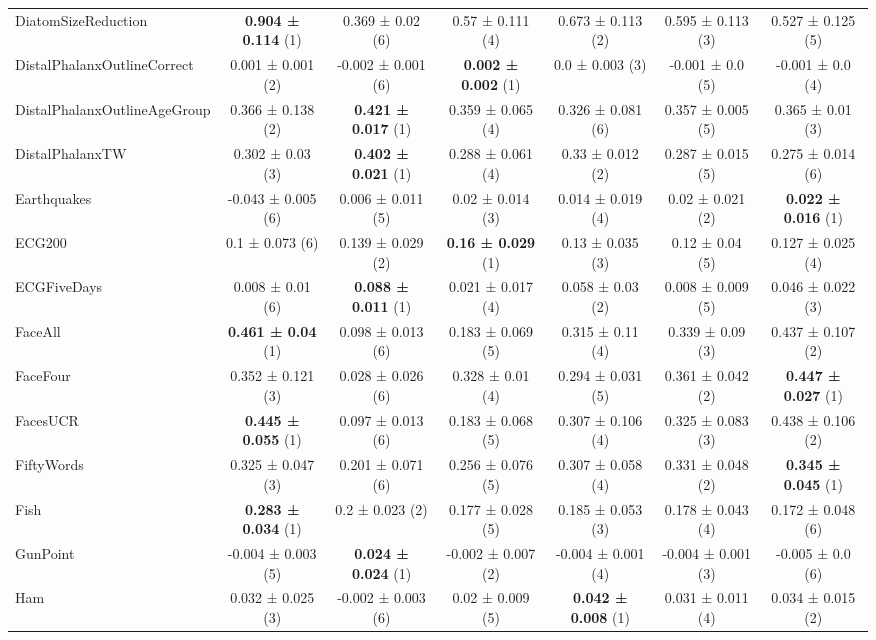 \begin{table}[ht]
\begin{adjustbox}{width=\textwidth}
\begin{tabular}{lcccccc}
    DiatomSizeReduction & \textbf{0.904 ± 0.114} (1) & 0.369 ± 0.02 (6) & 0.57 ± 0.111 (4) & 0.673 ± 0.113 (2) & 0.595 ± 0.113 (3) & 0.527 ± 0.125 (5) \\
    DistalPhalanxOutlineCorrect & 0.001 ± 0.001 (2) & -0.002 ± 0.001 (6) & \textbf{0.002 ± 0.002} (1) & 0.0 ± 0.003 (3) & -0.001 ± 0.0 (5) & -0.001 ± 0.0 (4) \\
    DistalPhalanxOutlineAgeGroup & 0.366 ± 0.138 (2) & \textbf{0.421 ± 0.017} (1) & 0.359 ± 0.065 (4) & 0.326 ± 0.081 (6) & 0.357 ± 0.005 (5) & 0.365 ± 0.01 (3) \\
    DistalPhalanxTW & 0.302 ± 0.03 (3) & \textbf{0.402 ± 0.021} (1) & 0.288 ± 0.061 (4) & 0.33 ± 0.012 (2) & 0.287 ± 0.015 (5) & 0.275 ± 0.014 (6) \\
    Earthquakes & -0.043 ± 0.005 (6) & 0.006 ± 0.011 (5) & 0.02 ± 0.014 (3) & 0.014 ± 0.019 (4) & 0.02 ± 0.021 (2) & \textbf{0.022 ± 0.016} (1) \\
    ECG200 & 0.1 ± 0.073 (6) & 0.139 ± 0.029 (2) & \textbf{0.16 ± 0.029} (1) & 0.13 ± 0.035 (3) & 0.12 ± 0.04 (5) & 0.127 ± 0.025 (4) \\
    ECGFiveDays & 0.008 ± 0.01 (6) & \textbf{0.088 ± 0.011} (1) & 0.021 ± 0.017 (4) & 0.058 ± 0.03 (2) & 0.008 ± 0.009 (5) & 0.046 ± 0.022 (3) \\
    FaceAll & \textbf{0.461 ± 0.04} (1) & 0.098 ± 0.013 (6) & 0.183 ± 0.069 (5) & 0.315 ± 0.11 (4) & 0.339 ± 0.09 (3) & 0.437 ± 0.107 (2) \\
    FaceFour & 0.352 ± 0.121 (3) & 0.028 ± 0.026 (6) & 0.328 ± 0.01 (4) & 0.294 ± 0.031 (5) & 0.361 ± 0.042 (2) & \textbf{0.447 ± 0.027} (1) \\
    FacesUCR & \textbf{0.445 ± 0.055} (1) & 0.097 ± 0.013 (6) & 0.183 ± 0.068 (5) & 0.307 ± 0.106 (4) & 0.325 ± 0.083 (3) & 0.438 ± 0.106 (2) \\
    FiftyWords & 0.325 ± 0.047 (3) & 0.201 ± 0.071 (6) & 0.256 ± 0.076 (5) & 0.307 ± 0.058 (4) & 0.331 ± 0.048 (2) & \textbf{0.345 ± 0.045} (1) \\
    Fish & \textbf{0.283 ± 0.034} (1) & 0.2 ± 0.023 (2) & 0.177 ± 0.028 (5) & 0.185 ± 0.053 (3) & 0.178 ± 0.043 (4) & 0.172 ± 0.048 (6) \\
    GunPoint & -0.004 ± 0.003 (5) & \textbf{0.024 ± 0.024} (1) & -0.002 ± 0.007 (2) & -0.004 ± 0.001 (4) & -0.004 ± 0.001 (3) & -0.005 ± 0.0 (6) \\
    Ham & 0.032 ± 0.025 (3) & -0.002 ± 0.003 (6) & 0.02 ± 0.009 (5) & \textbf{0.042 ± 0.008} (1) & 0.031 ± 0.011 (4) & 0.034 ± 0.015 (2) \\

\end{tabular}
\end{adjustbox}
\end{table}
